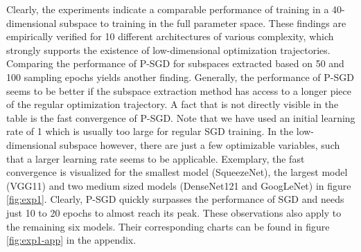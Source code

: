 \documentclass[11pt, a4paper]{article}
\begin{document}
Clearly, the experiments indicate a comparable performance of training in a 40-dimensional subspace to training in the full parameter space. These findings are empirically verified for 10 different architectures of various complexity, which strongly supports the existence of low-dimensional optimization trajectories. Comparing the performance of P-SGD for subspaces extracted based on 50 and 100 sampling epochs yields another finding. Generally, the performance of P-SGD seems to be better if the subspace extraction method has access to a longer piece of the regular optimization trajectory. A fact that is not directly visible in the table is the fast convergence of P-SGD. Note that we have used an initial learning rate of 1 which is usually too large for regular SGD training. In the low-dimensional subspace however, there are just a few optimizable variables, such that a larger learning rate seems to be applicable. Exemplary, the fast convergence is visualized for the smallest model (SqueezeNet), the largest model (VGG11) and two medium sized models (DenseNet121 and GoogLeNet) in figure \ref{fig:exp1}. Clearly, P-SGD quickly surpasses the performance of SGD and needs just 10 to 20 epochs to almost reach its peak. These observations also apply to the remaining six models. Their corresponding charts can be found in figure \ref{fig:exp1-app} in the appendix.
\end{document}
